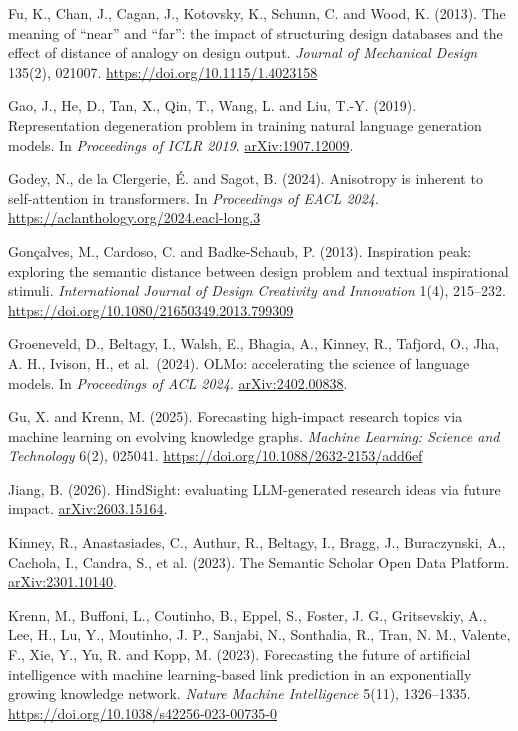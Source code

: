 \documentclass[
  10pt,
]{article}
\begin{document}
\hypertarget{ref-Fu2013}{}Fu, K., Chan,
J., Cagan, J., Kotovsky, K., Schunn, C.
and Wood, K. (2013). The meaning of
``near'' and ``far'': the impact of
structuring design databases and the
effect of distance of analogy on design
output. \emph{Journal of Mechanical
Design} 135(2), 021007.
\url{https://doi.org/10.1115/1.4023158}

\hypertarget{ref-Gao2019}{}Gao, J., He,
D., Tan, X., Qin, T., Wang, L. and Liu,
T.-Y. (2019). Representation
degeneration problem in training natural
language generation models. In
\emph{Proceedings of ICLR 2019}.
\href{https://arxiv.org/abs/1907.12009}{arXiv:1907.12009}.

\hypertarget{ref-Godey2024}{}Godey, N.,
de la Clergerie, É. and Sagot, B.
(2024). Anisotropy is inherent to
self-attention in transformers. In
\emph{Proceedings of EACL 2024}.
\url{https://aclanthology.org/2024.eacl-long.3}

\hypertarget{ref-Gon�alves2013}{}Gonçalves,
M., Cardoso, C. and Badke-Schaub, P.
(2013). Inspiration peak: exploring the
semantic distance between design problem
and textual inspirational stimuli.
\emph{International Journal of Design
Creativity and Innovation} 1(4),
215--232.
\url{https://doi.org/10.1080/21650349.2013.799309}

\hypertarget{ref-Groeneveld2024}{}Groeneveld,
D., Beltagy, I., Walsh, E., Bhagia, A.,
Kinney, R., Tafjord, O., Jha, A. H.,
Ivison, H., et al.~(2024). OLMo:
accelerating the science of language
models. In \emph{Proceedings of ACL
2024}.
\href{https://arxiv.org/abs/2402.00838}{arXiv:2402.00838}.

\hypertarget{ref-Gu2025}{}Gu, X. and
Krenn, M. (2025). Forecasting
high-impact research topics via machine
learning on evolving knowledge graphs.
\emph{Machine Learning: Science and
Technology} 6(2), 025041.
\url{https://doi.org/10.1088/2632-2153/add6ef}

\hypertarget{ref-Jiang2026}{}Jiang, B.
(2026). HindSight: evaluating
LLM-generated research ideas via future
impact.
\href{https://arxiv.org/abs/2603.15164}{arXiv:2603.15164}.

\hypertarget{ref-Kinney2023}{}Kinney,
R., Anastasiades, C., Authur, R.,
Beltagy, I., Bragg, J., Buraczynski, A.,
Cachola, I., Candra, S., et al. (2023).
The Semantic Scholar Open Data Platform.
\href{https://arxiv.org/abs/2301.10140}{arXiv:2301.10140}.

\hypertarget{ref-Krenn2023}{}Krenn, M.,
Buffoni, L., Coutinho, B., Eppel, S.,
Foster, J. G., Gritsevskiy, A., Lee, H.,
Lu, Y., Moutinho, J. P., Sanjabi, N.,
Sonthalia, R., Tran, N. M., Valente, F.,
Xie, Y., Yu, R. and Kopp, M. (2023).
Forecasting the future of artificial
intelligence with machine learning-based
link prediction in an exponentially
growing knowledge network. \emph{Nature
Machine Intelligence} 5(11), 1326--1335.
\url{https://doi.org/10.1038/s42256-023-00735-0}
\end{document}
